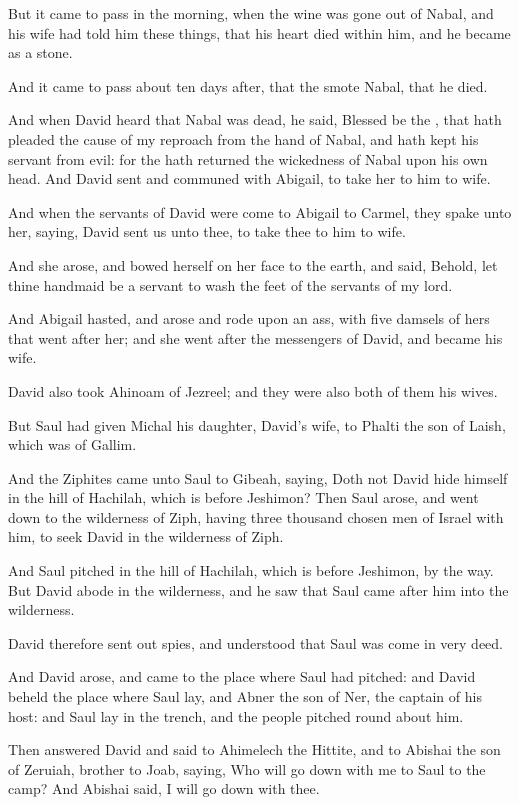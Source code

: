 \Verse But it came to pass in the morning, when the wine was gone out of Nabal, and his wife had told him these things, that his heart died within him, and he became as a stone.

\Verse And it came to pass about ten days after, that the \LORD smote Nabal, that he died.

\Verse And when David heard that Nabal was dead, he said, Blessed be the \LORD, that hath pleaded the cause of my reproach from the hand of Nabal, and hath kept his servant from evil: for the \LORD hath returned the wickedness of Nabal upon his own head. And David sent and communed with Abigail, to take her to him to wife.

\Verse And when the servants of David were come to Abigail to Carmel, they spake unto her, saying, David sent us unto thee, to take thee to him to wife.

\Verse And she arose, and bowed herself on her face to the earth, and said, Behold, let thine handmaid be a servant to wash the feet of the servants of my lord.

\Verse And Abigail hasted, and arose and rode upon an ass, with five damsels of hers that went after her; and she went after the messengers of David, and became his wife.

\Verse David also took Ahinoam of Jezreel; and they were also both of them his wives.

\Verse But Saul had given Michal his daughter, David's wife, to Phalti the son of Laish, which was of Gallim.


\Chapter
\Verse And the Ziphites came unto Saul to Gibeah, saying, Doth not David hide himself in the hill of Hachilah, which is before Jeshimon?  \Verse Then Saul arose, and went down to the wilderness of Ziph, having three thousand chosen men of Israel with him, to seek David in the wilderness of Ziph.

\Verse And Saul pitched in the hill of Hachilah, which is before Jeshimon, by the way. But David abode in the wilderness, and he saw that Saul came after him into the wilderness.

\Verse David therefore sent out spies, and understood that Saul was come in very deed.

\Verse And David arose, and came to the place where Saul had pitched: and David beheld the place where Saul lay, and Abner the son of Ner, the captain of his host: and Saul lay in the trench, and the people pitched round about him.

\Verse Then answered David and said to Ahimelech the Hittite, and to Abishai the son of Zeruiah, brother to Joab, saying, Who will go down with me to Saul to the camp? And Abishai said, I will go down with thee.

